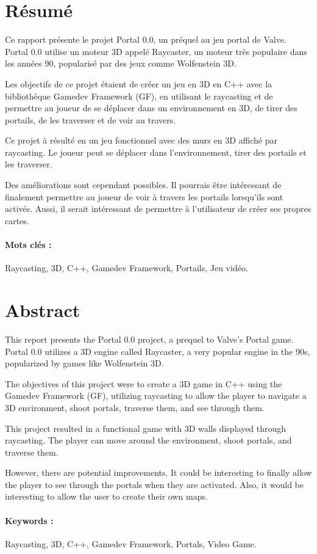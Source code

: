 \documentclass[11pt]{article}
\begin{document}
\newpage
\thispagestyle{empty}
\section*{Résumé}
Ce rapport présente le projet Portal 0.0, un préquel au jeu portal de Valve.
Portal 0.0 utilise un moteur 3D appelé Raycaster, un moteur très populaire
dans les années 90, popularisé par des jeux comme Wolfenstein 3D.

Les objectifs de ce projet étaient de créer un jeu en 3D  en C++ avec la bibliothèque
Gamedev Framework (GF), en utilisant le raycasting
et de permettre au joueur de se déplacer dans un environnement en 3D, de tirer des portails,
de les traverser et de voir au travers.

Ce projet à résulté en un jeu fonctionnel avec des murs en 3D 
affiché par raycasting. Le joueur peut se déplacer dans l'environnement,
tirer des portails et les traverser. 

Des améliorations sont cependant possibles. Il pourrais être intéressant
de finalement permettre au joueur de voir à travers les portails 
lorsqu'ils sont activés. Aussi, il serait intéressant de permettre
à l'utilisateur de créer ses propres cartes.

\paragraph{\textbf{Mots clés :}} Raycasting, 3D, C++, Gamedev Framework, Portails, Jeu vidéo.

\hrulefill

\section*{Abstract}
This report presents the Portal 0.0 project, a prequel to Valve's Portal game. Portal 0.0 utilizes a 3D engine called Raycaster, a very popular engine in the 90s, popularized by games like Wolfenstein 3D.

The objectives of this project were to create a 3D game in C++ using the Gamedev Framework (GF), utilizing raycasting to allow the player to navigate a 3D environment, shoot portals, traverse them, and see through them.

This project resulted in a functional game with 3D walls displayed through raycasting. The player can move around the environment, shoot portals, and traverse them.

However, there are potential improvements. It could be interesting to finally allow the player to see through the portals when they are activated. Also, it would be interesting to allow the user to create their own maps.

\paragraph{\textbf{Keywords :}} Raycasting, 3D, C++, Gamedev Framework, Portals, Video Game.
\end{document}
